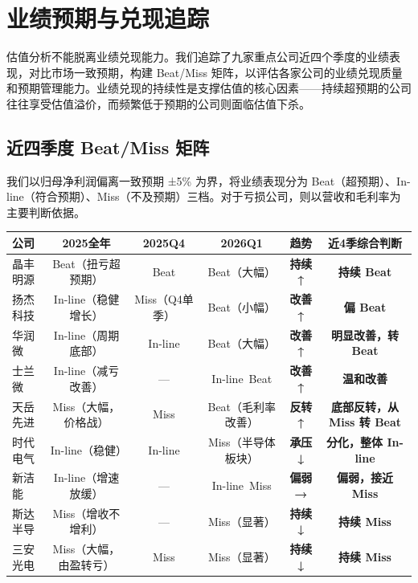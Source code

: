 \section{业绩预期与兑现追踪}

估值分析不能脱离业绩兑现能力。我们追踪了九家重点公司近四个季度的业绩表现，对比市场一致预期，构建 Beat/Miss 矩阵，以评估各家公司的业绩兑现质量和预期管理能力。业绩兑现的持续性是支撑估值的核心因素——持续超预期的公司往往享受估值溢价，而频繁低于预期的公司则面临估值下杀。

\subsection{近四季度 Beat/Miss 矩阵}

我们以归母净利润偏离一致预期 ±5\% 为界，将业绩表现分为 Beat（超预期）、In-line（符合预期）、Miss（不及预期）三档。对于亏损公司，则以营收和毛利率为主要判断依据。

\begin{exhibitbox}
\centering
\small
\begin{tabularx}{\textwidth}{l c c c c c}
\toprule
\textbf{公司} & \textbf{2025全年} & \textbf{2025Q4} & \textbf{2026Q1} & \textbf{趋势} & \textbf{近4季综合判断} \\
\midrule
\rowcolor{riskgreen!10}
晶丰明源 & Beat（扭亏超预期） & Beat & Beat（大幅） & \textcolor{riskgreen}{\textbf{持续↑}} & \textbf{持续 Beat} \\
\rowcolor{riskgreen!10}
扬杰科技 & In-line（稳健增长） & Miss（Q4单季） & Beat（小幅） & \textcolor{riskgreen}{\textbf{改善↑}} & \textbf{偏 Beat} \\
\rowcolor{riskamber!10}
华润微 & In-line（周期底部） & In-line & Beat（大幅） & \textcolor{riskgreen}{\textbf{改善↑}} & \textbf{明显改善，转 Beat} \\
\rowcolor{riskamber!10}
士兰微 & In-line（减亏改善） & — & In-line~Beat & \textcolor{riskgreen}{\textbf{改善↑}} & \textbf{温和改善} \\
\rowcolor{riskamber!10}
天岳先进 & Miss（大幅，价格战） & Miss & Beat（毛利率改善） & \textcolor{riskgreen}{\textbf{反转↑}} & \textbf{底部反转，从 Miss 转 Beat} \\
\rowcolor{riskamber!10}
时代电气 & In-line（稳健） & In-line & Miss（半导体板块） & \textcolor{riskred}{\textbf{承压↓}} & \textbf{分化，整体 In-line} \\
\rowcolor{riskred!10}
新洁能 & In-line（增速放缓） & — & In-line~Miss & \textcolor{riskred}{\textbf{偏弱→}} & \textbf{偏弱，接近 Miss} \\
\rowcolor{riskred!10}
斯达半导 & Miss（增收不增利） & — & Miss（显著） & \textcolor{riskred}{\textbf{持续↓}} & \textbf{持续 Miss} \\
\rowcolor{riskred!10}
三安光电 & Miss（大幅，由盈转亏） & Miss & Miss（显著） & \textcolor{riskred}{\textbf{持续↓}} & \textbf{持续 Miss} \\
\bottomrule
\end{tabularx}
\end{exhibitbox}

